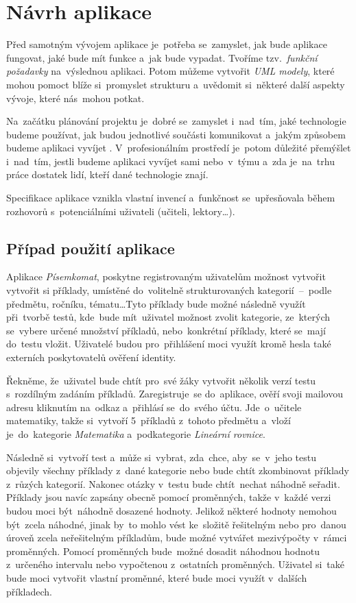 \documentclass[11pt,a4paper]{report}
\begin{document}
	\chapter{Návrh aplikace}
        Před samotným vývojem aplikace je~potřeba se~zamyslet, jak bude aplikace fungovat, jaké bude mít funkce a~jak bude vypadat. Tvoříme tzv.~\emph{funkční požadavky} na~výslednou aplikaci. Potom můžeme vytvořit \emph{UML modely}, které mohou pomoct blíže si~promyslet strukturu a~uvědomit si~některé další aspekty vývoje, které nás~mohou potkat.

        Na~začátku plánování projektu je~dobré se~zamyslet i~nad~tím, jaké technologie budeme používat, jak budou jednotlivé součásti komunikovat a~jakým způsobem budeme aplikaci vyvíjet \cite{bctynovsky:specifikacepozadavku}. V~profesionálním prostředí je~potom důležité přemýšlet i~nad~tím, jestli budeme aplikaci vyvíjet sami nebo~v~týmu a~zda je~na~trhu práce dostatek lidí, kteří dané technologie znají.

        Specifikace aplikace vznikla vlastní invencí a~funkčnost se~upřesňovala během rozhovorů s~potenciálními uživateli (učiteli, lektory\dots).

        \section{Případ použití aplikace}
            Aplikace \emph{Písemkomat}, poskytne registrovaným uživatelům možnost vytvořit vytvořit si příklady, umístěné do~volitelně strukturovaných kategorií~--~podle předmětu, ročníku, tématu\dots Tyto příklady bude možné následně využít při~tvorbě testů, kde~bude mít~uživatel možnost zvolit kategorie, ze~kterých se~vybere určené množství příkladů, nebo~konkrétní příklady, které se~mají do~testu vložit. Uživatelé budou pro~přihlášení moci využít kromě hesla také externích poskytovatelů ověření identity.
            
            Řekněme, že~uživatel bude chtít pro~své žáky vytvořit několik verzí testu s~rozdílným zadáním příkladů. Zaregistruje~se do~aplikace, ověří svoji mailovou adresu kliknutím na~odkaz a~přihlásí se~do~svého účtu. Jde~o~učitele matematiky, takže si~vytvoří 5~příkladů z~tohoto předmětu a~vloží je~do~kategorie \emph{Matematika} a~podkategorie \emph{Lineární rovnice}.

            Následně si~vytvoří test a~může si~vybrat, zda~chce, aby~se~v~jeho testu objevily všechny příklady z~dané kategorie nebo bude chtít zkombinovat příklady z~růzých kategorií. Nakonec otázky v~testu bude chtít~nechat náhodně seřadit. Příklady jsou navíc zapsány obecně pomocí proměnných, takže v~každé verzi budou moci být~náhodně dosazené hodnoty. Jelikož některé hodnoty nemohou být~zcela náhodné, jinak by~to mohlo vést ke~složitě řešitelným nebo pro~danou úroveň zcela neřešitelným příkladům, bude možné vytvářet mezivýpočty v~rámci proměnných. Pomocí proměnných bude~možné dosadit náhodnou hodnotu z~určeného intervalu nebo vypočtenou z~ostatních proměnných. Uživatel si~také bude moci vytvořit vlastní proměnné, které bude moci využít v~dalších příkladech. 
\end{document}
